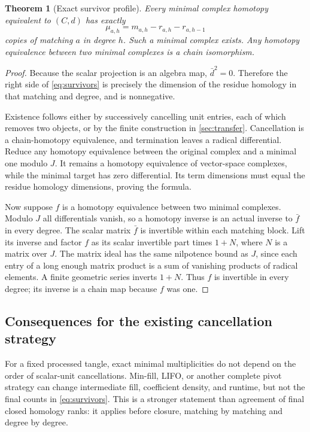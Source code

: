 \documentclass[11pt,letterpaper]{article}
\newtheorem{theorem}{Theorem}[section]
\theoremstyle{definition}
\theoremstyle{remark}
\begin{document}
\begin{theorem}[Exact survivor profile]\label{thm:survivors}
Every minimal complex homotopy equivalent to $(C,d)$ has exactly
\begin{equation}\label{eq:survivors}
 \boxed{\ \mu_{a,h}=m_{a,h}-r_{a,h}-r_{a,h-1}\ }
\end{equation}
copies of matching $a$ in degree $h$. Such a minimal complex exists.
Any homotopy equivalence between two minimal complexes is a chain isomorphism.
\end{theorem}
\begin{proof}
Because the scalar projection is an algebra map, $\bar d^2=0$. Therefore the
right side of \cref{eq:survivors} is precisely the dimension of the residue
homology in that matching and degree, and is nonnegative.

Existence follows either by successively cancelling unit entries, each of which
removes two objects, or by the finite construction in \cref{sec:transfer}.
Cancellation is a chain-homotopy equivalence, and termination leaves a radical
differential. Reduce any homotopy equivalence between the original complex and
a minimal one modulo $J$. It remains a homotopy equivalence of vector-space
complexes, while the minimal target has zero differential. Its term dimensions
must equal the residue homology dimensions, proving the formula.

Now suppose $f$ is a homotopy equivalence between two minimal complexes.
Modulo $J$ all differentials vanish, so a homotopy inverse is an actual inverse
to $\bar f$ in every degree. The scalar matrix $\bar f$ is invertible within
each matching block. Lift its inverse and factor $f$ as its scalar invertible
part times $1+N$, where $N$ is a matrix over $J$. The matrix ideal has the
same nilpotence bound as $J$, since each entry of a long enough matrix product
is a sum of vanishing products of radical elements. A finite geometric series
inverts $1+N$. Thus $f$ is invertible in every degree; its inverse is a chain
map because $f$ was one.
\end{proof}

\subsection{Consequences for the existing cancellation strategy}
For a fixed processed tangle, exact minimal multiplicities do not depend on the
order of scalar-unit cancellations. Min-fill, LIFO, or another complete pivot
strategy can change intermediate fill, coefficient density, and runtime, but
not the final counts in \cref{eq:survivors}. This is a stronger statement than
agreement of final closed homology ranks: it applies before closure, matching
by matching and degree by degree.
\end{document}
